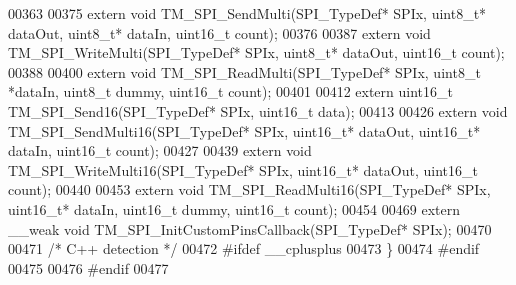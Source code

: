 \begin{DoxyCode}
00363 
00375 \textcolor{keyword}{extern} \textcolor{keywordtype}{void} TM\_SPI\_SendMulti(SPI\_TypeDef* SPIx, uint8\_t* dataOut, uint8\_t* dataIn, uint16\_t count);
00376 
00387 \textcolor{keyword}{extern} \textcolor{keywordtype}{void} TM\_SPI\_WriteMulti(SPI\_TypeDef* SPIx, uint8\_t* dataOut, uint16\_t count);
00388 
00400 \textcolor{keyword}{extern} \textcolor{keywordtype}{void} TM\_SPI\_ReadMulti(SPI\_TypeDef* SPIx, uint8\_t *dataIn, uint8\_t dummy, uint16\_t count);
00401 
00412 \textcolor{keyword}{extern} uint16\_t TM\_SPI\_Send16(SPI\_TypeDef* SPIx, uint16\_t data);
00413 
00426 \textcolor{keyword}{extern} \textcolor{keywordtype}{void} TM\_SPI\_SendMulti16(SPI\_TypeDef* SPIx, uint16\_t* dataOut, uint16\_t* dataIn, uint16\_t count);
00427 
00439 \textcolor{keyword}{extern} \textcolor{keywordtype}{void} TM\_SPI\_WriteMulti16(SPI\_TypeDef* SPIx, uint16\_t* dataOut, uint16\_t count);
00440 
00453 \textcolor{keyword}{extern} \textcolor{keywordtype}{void} TM\_SPI\_ReadMulti16(SPI\_TypeDef* SPIx, uint16\_t* dataIn, uint16\_t dummy, uint16\_t count);
00454 
00469 \textcolor{keyword}{extern} \_\_weak \textcolor{keywordtype}{void} TM\_SPI\_InitCustomPinsCallback(SPI\_TypeDef* SPIx);
00470 
00471 \textcolor{comment}{/* C++ detection */}
00472 \textcolor{preprocessor}{#ifdef \_\_cplusplus}
00473 \}
00474 \textcolor{preprocessor}{#endif}
00475 
00476 \textcolor{preprocessor}{#endif}
00477 
\end{DoxyCode}
